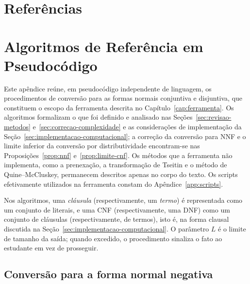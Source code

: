 \documentclass[12pt,a4paper,oneside]{report}
\theoremstyle{tituloplain}
\theoremstyle{titulodef}
\begin{document}
\chapter*{Referências}




\appendix

\chapter{Algoritmos de Referência em Pseudocódigo}\label{app:pseudocodigo}

Este apêndice reúne, em pseudocódigo independente de linguagem, os procedimentos de conversão para as formas normais conjuntiva e disjuntiva, que constituem o escopo da ferramenta descrita no Capítulo~\ref{cap:ferramenta}. Os algoritmos formalizam o que foi definido e analisado nas Seções~\ref{sec:revisao-metodos} e~\ref{sec:correcao-complexidade} e as considerações de implementação da Seção~\ref{sec:implementacao-computacional}; a correção da conversão para NNF e o limite inferior da conversão por distributividade encontram-se nas Proposições~\ref{prop:nnf} e~\ref{prop:limite-cnf}. Os métodos que a ferramenta não implementa, como a prenexação, a transformação de Tseitin e o método de Quine--McCluskey, permanecem descritos apenas no corpo do texto. Os scripts efetivamente utilizados na ferramenta constam do Apêndice~\ref{app:scripts}.

Nos algoritmos, uma \textit{cláusula} (respectivamente, um \textit{termo}) é representada como um conjunto de literais, e uma CNF (respectivamente, uma DNF) como um conjunto de cláusulas (respectivamente, de termos), isto é, na forma clausal discutida na Seção~\ref{sec:implementacao-computacional}. O parâmetro $L$ é o limite de tamanho da saída; quando excedido, o procedimento sinaliza o fato ao estudante em vez de prosseguir.

\section{Conversão para a forma normal negativa}
\end{document}
